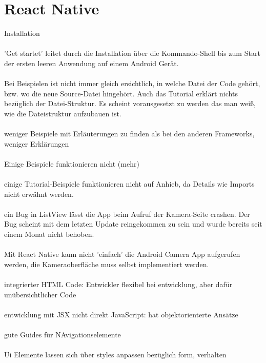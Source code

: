 \section{React Native}

Installation
\\
\\
'Get startet' leitet durch die Installation über die Kommando-Shell bis zum Start der ersten leeren Anwendung auf einem Android Gerät.
\\
\\
Bei Beispielen ist nicht immer gleich ersichtlich, in welche Datei der Code gehört, bzw. wo die neue Source-Datei hingehört. Auch das Tutorial erklärt nichts bezüglich der Datei-Struktur. Es scheint vorausgesetzt zu werden das man weiß, wie die Dateistruktur aufzubauen ist. 
\\
\\
weniger Beispiele mit Erläuterungen zu finden als bei den anderen Frameworks, weniger Erklärungen
\\
\\
Einige Beispiele funktionieren nicht (mehr)
\\
\\
einige Tutorial-Beispiele funktionieren nicht auf Anhieb, da Details wie Imports nicht erwähnt werden.
\\
\\
ein Bug in ListView lässt die App beim Aufruf der Kamera-Seite crashen. Der Bug scheint mit dem letzten Update reingekommen zu sein und wurde bereits seit einem Monat nicht behoben. 
\\
\\
Mit React Native kann nicht 'einfach' die Android Camera App aufgerufen werden, die Kameraoberfläche muss selbst implementiert werden.
\\
\\
integrierter HTML Code: Entwickler flexibel bei entwicklung, aber dafür unübersichtlicher Code
\\
\\
entwicklung mit JSX nicht direkt JavaScript: hat objektorienterte Ansätze
\\
\\ 
gute Guides für NAvigationselemente
\\
\\
Ui Elemente lassen sich über styles anpassen bezüglich form, verhalten